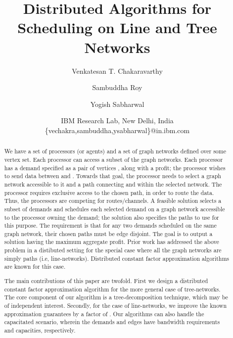 \documentclass[11pt]{article}
\title{Distributed Algorithms for Scheduling on Line and Tree Networks}
\author{
Venkatesan T. Chakaravarthy \and Sambuddha Roy \and Yogish Sabharwal
}
\date{IBM Research Lab, New Delhi, India\\
\{vechakra,sambuddha,ysabharwal\}@in.ibm.com
}
\begin{document}
\maketitle              

\begin{abstract}
We have a set of processors (or agents) and a set of graph networks defined over some vertex set.
Each processor can access a subset of the graph networks.
Each processor has a demand specified as a pair of vertices , along with a profit; 
the processor wishes to send data between  and .
Towards that goal, the processor needs to select a graph network accessible to it
and a path connecting  and  within the selected network.
The processor requires exclusive access to the chosen path, in order to route the data.
Thus, the processors are competing for routes/channels.
A feasible solution selects a subset of demands and schedules each selected demand
on a graph network accessible to the processor owning the demand; the solution also 
specifies the paths to use for this purpose.
The requirement is that for any two demands scheduled on the same graph network,
their chosen paths must be edge disjoint.
The goal is to output a solution having the maximum aggregate profit.
Prior work has addressed the above problem in a distibuted setting
for the special case where all the graph networks are simply paths (i.e, line-networks).
Distributed constant factor approximation algorithms are known for this case.

The main contributions of this paper are twofold. 
First we design a distributed constant factor approximation algorithm for the more general case of tree-networks.
The core component of our algorithm is a tree-decomposition technique, which may be of independent interest.
Secondly, for the case of line-networks, we improve the known approximation guarantees by a factor of .
Our algorithms can also handle the capacitated scenario, wherein the demands and edges have bandwidth requirements
and capacities, respectively.
\end{abstract}
\end{document}
